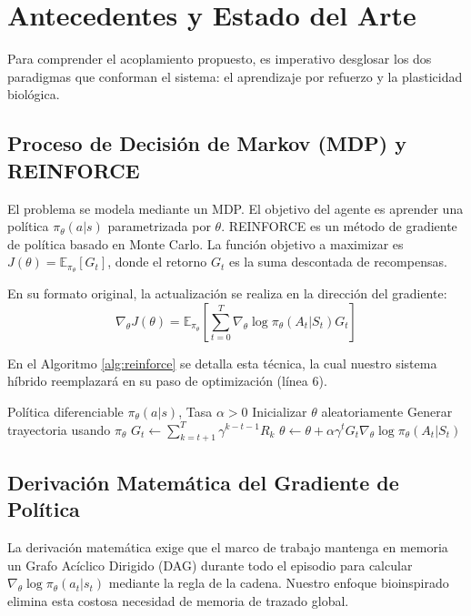\documentclass[conference, 10pt]{IEEEtran}
\begin{document}
\section{Antecedentes y Estado del Arte}
Para comprender el acoplamiento propuesto, es imperativo desglosar los dos paradigmas que conforman el sistema: el aprendizaje por refuerzo y la plasticidad biológica.

\subsection{Proceso de Decisión de Markov (MDP) y REINFORCE}
El problema se modela mediante un MDP. El objetivo del agente es aprender una política $\pi_{\theta}(a|s)$ parametrizada por $\theta$. 
REINFORCE \cite{williams1992} es un método de gradiente de política basado en Monte Carlo. La función objetivo a maximizar es $J(\theta) = \mathbb{E}_{\pi_{\theta}}[G_t]$, donde el retorno $G_t$ es la suma descontada de recompensas. 

En su formato original, la actualización se realiza en la dirección del gradiente:
\begin{equation}
\nabla_{\theta} J(\theta) = \mathbb{E}_{\pi_{\theta}} \left[ \sum_{t=0}^{T} \nabla_{\theta} \log \pi_{\theta}(A_t|S_t) G_t \right]
\end{equation}

En el Algoritmo \ref{alg:reinforce} se detalla esta técnica, la cual nuestro sistema híbrido reemplazará en su paso de optimización (línea 6).

\begin{algorithm}[htbp]
\caption{REINFORCE Clásico (Optimización por Gradiente)}\label{alg:reinforce}
\begin{algorithmic}[1]
\Require Política diferenciable $\pi_\theta(a|s)$, Tasa $\alpha > 0$
\State Inicializar $\theta$ aleatoriamente
\Loop {}
    \State Generar trayectoria usando $\pi_\theta$
        \State $G_t \gets \sum_{k=t+1}^T \gamma^{k-t-1} R_k$
        \State $\theta \gets \theta + \alpha \gamma^t G_t \nabla_\theta \log \pi_\theta(A_t|S_t)$ 
    \EndFor
\EndLoop
\end{algorithmic}
\end{algorithm}

\subsection{Derivación Matemática del Gradiente de Política}
La derivación matemática exige que el marco de trabajo mantenga en memoria un Grafo Acíclico Dirigido (DAG) durante todo el episodio para calcular $\nabla_\theta \log \pi_\theta(a_t | s_t)$ mediante la regla de la cadena. Nuestro enfoque bioinspirado elimina esta costosa necesidad de memoria de trazado global.
\end{document}
